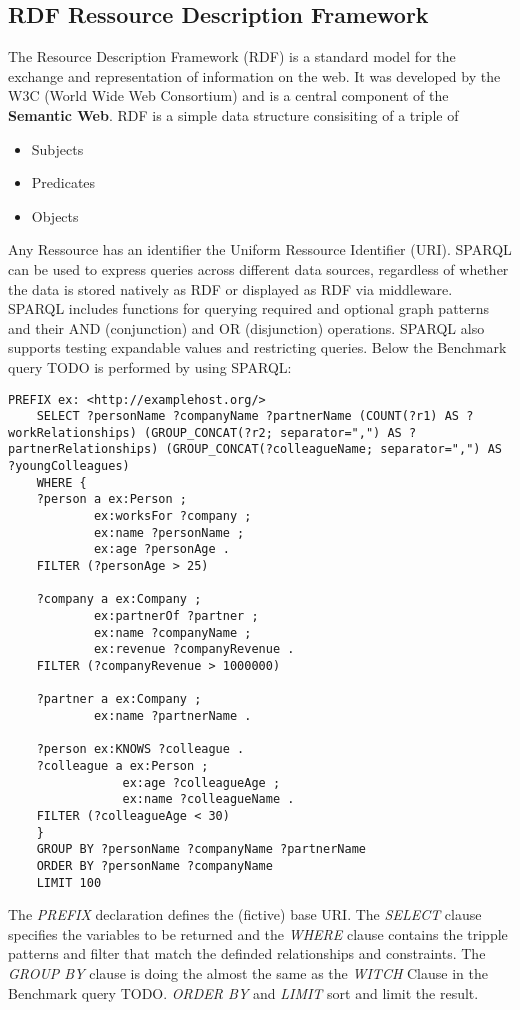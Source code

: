 \subsection{RDF Ressource Description Framework}
\label{subsec:different_query_languages_for_graph_databases:sparql:rdf}
The Resource Description Framework (RDF) is a standard model 
for the exchange and representation of information on the web. 
It was developed by the W3C (World Wide Web Consortium) and is a central component 
of the \textbf{Semantic Web}.
RDF is a simple data structure consisiting of a triple of
\begin{itemize}
	\item Subjects
	\item Predicates 
	\item Objects 
\end{itemize}
Any Ressource has an identifier the Uniform Ressource Identifier (URI).
SPARQL can be used to express queries across different data sources, 
regardless of whether the data is stored natively as RDF or displayed as RDF via middleware. 
SPARQL includes functions for querying required and optional graph patterns 
and their AND (conjunction) and OR (disjunction) operations. 
SPARQL also supports testing expandable values and restricting queries.
Below the Benchmark query TODO is performed by using SPARQL:
\begin{lstlisting}[caption={Benchmark query in SPARQL}, label={lst:benchmarkSPQARQL}]
	PREFIX ex: <http://examplehost.org/>
	SELECT ?personName ?companyName ?partnerName (COUNT(?r1) AS ?workRelationships) (GROUP_CONCAT(?r2; separator=",") AS ?partnerRelationships) (GROUP_CONCAT(?colleagueName; separator=",") AS ?youngColleagues)
	WHERE {
	?person a ex:Person ;
			ex:worksFor ?company ;
			ex:name ?personName ;
			ex:age ?personAge .
	FILTER (?personAge > 25)

	?company a ex:Company ;
			ex:partnerOf ?partner ;
			ex:name ?companyName ;
			ex:revenue ?companyRevenue .
	FILTER (?companyRevenue > 1000000)

	?partner a ex:Company ;
			ex:name ?partnerName .
	
	?person ex:KNOWS ?colleague .
	?colleague a ex:Person ;
				ex:age ?colleagueAge ;
				ex:name ?colleagueName .
	FILTER (?colleagueAge < 30)
	}
	GROUP BY ?personName ?companyName ?partnerName
	ORDER BY ?personName ?companyName
	LIMIT 100
\end{lstlisting}
The \textit{PREFIX} declaration defines the (fictive) base URI.
The \textit{SELECT} clause specifies the variables to be returned and the
\textit{WHERE} clause contains the tripple patterns and filter that match 
the definded relationships and constraints.
The \textit{GROUP BY} clause is doing the almost the same as the \textit{WITCH} Clause in 
the Benchmark query TODO.
\textit{ORDER BY} and \textit{LIMIT} sort and limit the result.
 
